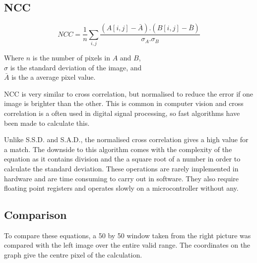 \subsection{NCC}\label{Section:NCC}
\begin{equation}\label{eq:NCC}
NCC =  \frac{1}{n}\sum\limits_{i,j} \frac{(A[i,j] - \bar{A}).(B[i,j] - \bar{B})}{\sigma _A . \sigma _B}
\end{equation}
\begin{center}
Where $n$ is the number of pixels in $A$ and $B$, \\$\sigma$ is the standard deviation of the image, and \\$\bar{A}$ is the a average pixel value. 
\end{center}
NCC is very similar to cross correlation, but normalised to reduce the error if one image is brighter than the other. This is common in computer vision \citep{Tsai:NCC} and cross correlation is a often used in digital signal processing, so fast algorithms have been made to calculate this. 

Unlike S.S.D. and S.A.D., the normalised cross correlation gives a high value for a match. The downside to this algorithm comes with the complexity of the equation as it contains division and the a square root of a number in order to calculate the standard deviation. These operations are rarely implemented in hardware and are time consuming to carry out in software. They also require floating point registers and operates slowly on a microcontroller without any. 



\subsection{Comparison}

To compare these equations, a 50 by 50 window taken from the right picture was compared with the left image over the entire valid range. The coordinates on the graph give the centre pixel of the calculation. 

